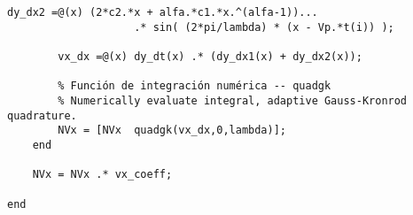 \begin{lstlisting}[]
        dy_dx2 =@(x) (2*c2.*x + alfa.*c1.*x.^(alfa-1))...
                    .* sin( (2*pi/lambda) * (x - Vp.*t(i)) ); 

        vx_dx =@(x) dy_dt(x) .* (dy_dx1(x) + dy_dx2(x));                                     

        % Función de integración numérica -- quadgk
        % Numerically evaluate integral, adaptive Gauss-Kronrod quadrature.
        NVx = [NVx  quadgk(vx_dx,0,lambda)];
    end

    NVx = NVx .* vx_coeff;
    
end
\end{lstlisting}

